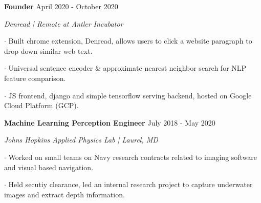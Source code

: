 \documentclass[11pt]{article} %
\begin{document}
    \textbf{\large Founder} \hfill April 2020 - October 2020
    \setlength{\parindent}{+0ex} \par
    \textit{Denread | Remote at Antler Incubator} \vspace{+1ex} \par
    $\boldsymbol{\cdot}$ Built chrome extension, Denread, allows users to click a website paragraph to drop down similar web text. \par \vspace{+1ex}
    $\boldsymbol{\cdot}$ Universal sentence encoder \& approximate nearest neighbor search for NLP feature comparison.\par \vspace{+1ex}
    $\boldsymbol{\cdot}$ JS frontend, django and simple tensorflow serving backend, hosted on Google Cloud Platform (GCP). \par 
    \vspace{+1ex}
    \textbf{\large Machine Learning Perception Engineer} \hfill July 2018 - May 2020 \vspace{-0ex}
	\setlength{\parindent}{-0ex} \par
		\textit{Johns Hopkins Applied Physics Lab | Laurel, MD} \vspace{+1ex} \par
		$\boldsymbol{\cdot}$ Worked on small teams on Navy research contracts related to imaging software and visual based navigation. \par \vspace{+1ex}
		$\boldsymbol{\cdot}$ Held secutiy clearance, led an internal research project to capture underwater images and extract depth information. \par \vspace{+1ex}
\end{document}
